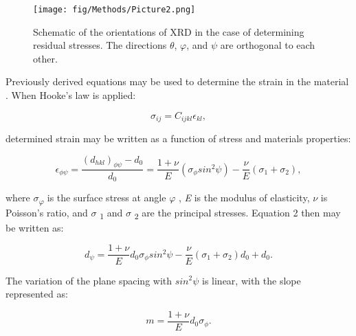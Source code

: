 		
		\begin{figure}
			\centering
			\texttt{[image: fig/Methods/Picture2.png]}
			\caption[Schematic of the orientations of XRD in the case of determining residual stresses.]{Schematic of the orientations of XRD in the case of determining residual stresses. The directions $ \theta$, $ \varphi$, and $ \psi$ are orthogonal to each other.}
			\label{fig:Methods2}
		\end{figure}
		
		
		
		Previously derived equations may be used to determine the strain in the material \cite{RN1385}. When Hooke’s law is applied:
		
		
		\begin{equation}		
			\sigma _{ij}=C_{ijkl} \epsilon _{kl},
		\end{equation}
		
		
		
		determined strain may be written as a function of stress and materials properties:
		
		
		\begin{equation}
			\epsilon _{ \phi  \psi }=\frac{ \left( d_{hkl} \right) _{ \phi  \psi }-d_{0}}{d_{0}}=\frac{1+ \nu }{E} \left(  \sigma _{ \phi }sin^{2} \psi  \right) -\frac{ \nu }{E} \left(  \sigma _{1}+ \sigma _{2} \right),
		\end{equation}
		
		where \textit{$ \sigma $\textsubscript{$ \varphi $  }}is the surface stress at angle \textit{$ \varphi $ }, \textit{E} is the modulus of elasticity, \textit{$ \nu $ } is Poisson’s ratio, and \textit{$ \sigma $ }\textsubscript{1} and \textit{$ \sigma $ }\textsubscript{2} are the principal stresses. Equation 2 then may be written as:
		
		
		
		\begin{equation}
			d_{ \psi }=\frac{1+ \nu }{E}d_{0}  \sigma _{ \phi }sin^{2} \psi  -\frac{ \nu }{E} (  \sigma _{1}+ \sigma _{2} ) d_{0}+d_{0}.	
		\end{equation}
		
		
		
		The variation of the plane spacing with  \( sin^{2} \psi  \)  is linear, with the slope represented as:
		
		
		
		\begin{equation}
		m=\frac{1+ \nu }{E}d_{0} \sigma _{ \phi }.
		\end{equation}
		
